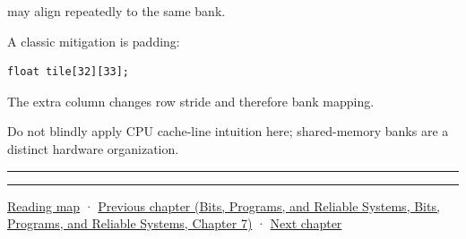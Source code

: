 may align repeatedly to the same bank.

A classic mitigation is padding:

\protect{}\label{ucsz3u}%
\begin{verbatim}
float tile[32][33];
\end{verbatim}

The extra column changes row stride and therefore bank mapping.

Do not blindly apply CPU cache-line intuition here; shared-memory banks are a distinct hardware organization.

\begin{center}\rule{0.5\linewidth}{0.5pt}\end{center}

\begin{center}\rule{0.5\linewidth}{0.5pt}\end{center}

\hyperref[volume-reading-map]{Reading map} · \href{../01-Bits-Programs-and-Reliable-Systems/main.pdf\#nameddest=01-foundations-i-ch007-typed-interfaces-identity-and-data-structures}{Previous chapter (Bits, Programs, and Reliable Systems, Bits, Programs, and Reliable Systems, Chapter 7)} · \hyperref[01-foundations-i-ch009-gpu-memory-divergence-atomics-and-ordering]{Next chapter}
